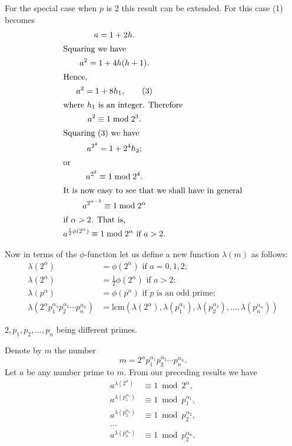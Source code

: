     
For the special case when $p$ is 2 this result can be extended. For
this case (1) becomes
\begin{gather}
a = 1 + 2h. \notag \\
\intertext{Squaring we have}
a^2 = 1 + 4h(h+1). \notag \\
\intertext{Hence,}
a^2 = 1+8h_1, \tag{3} \\
\intertext{where $h_1$ is an integer. Therefore}
a^2 \equiv 1 \bmod 2^3. \notag \\
\intertext{Squaring (3) we have}
a^{2^2} = 1 + 2^4h_2; \notag \\
\intertext{or}
a^{2^2} \equiv 1 \bmod 2^4. \notag \\
\intertext{It is now easy to see that we shall have in general}
a^{2^{\alpha-2}} \equiv 1 \bmod 2^{\alpha} \notag \\
\intertext{if $\alpha > 2$. That is,}
a^{\frac{1}{2}\phi(2^{\alpha})} \equiv 1 \bmod 2^{\alpha}
  \text{ if } a > 2.
\end{gather}

Now in terms of the $\phi$-function let us define a new function
$\lambda(m)$ as follows:
\begin{align*}
\lambda(2^{\alpha}) &= \phi(2^{\alpha}) \text{ if $a = 0, 1, 2$;} \\
\lambda(2^{\alpha}) &= \frac{1}{2}\phi(2^{\alpha})
                                               \text{ if $a > 2$;} \\
\lambda(p^{\alpha}) &= \phi(p^{\alpha})
                                   \text{ if $p$ is an odd prime;} \\
\lambda(2^{\alpha} p_1^{\alpha_1} p_2^{\alpha_2} \cdots p_n^{\alpha_n}) 
&= \text{lcm}(
    \lambda(2^{\alpha}),
    \lambda(p_1^{\alpha_1}),
    \lambda(p_2^{\alpha_2}), \ldots, \lambda(p_n^{\alpha_n}
    )
)
\end{align*}

$2, p_1, p_2, \ldots, p_n$ being different primes.%

Denote by $m$ the number
\begin{equation*}
m = 2^{\alpha}p_1^{\alpha_1}p_2^{\alpha_2} \cdots p_n^{\alpha_n}.
\end{equation*}
Let $a$ be any number prime to $m$. From our preceding results we
have
\begin{align*}
a^{\lambda(2^{\alpha})}     &\equiv 1 \bmod 2^{\alpha}, \\
a^{\lambda(p_1^{\alpha_1})} &\equiv 1 \bmod p_1^{\alpha_1},\\
a^{\lambda(p_2^{\alpha_2})} &\equiv 1 \bmod p_2^{\alpha_2}, \\
\ldots \\
a^{\lambda(p_n^{\alpha_n})} &\equiv 1 \bmod p_2^{\alpha_n}. \\
\end{align*}

